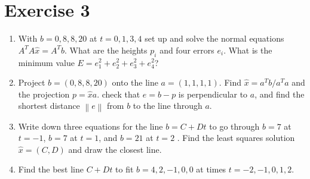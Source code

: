 \section{Exercise 3}
\begin{enumerate}[label=(\alph*)]
    \item With $b = 0, 8, 8, 20$ at $t = 0, 1,3, 4$ set up and solve the
        normal equations $A^{T}A\widehat{x}=A^{T}b$. What are the heights
        $p_{i}$ and four errors $e_{i}$. What is the minimum value $E =
        e_{1}^{2} + e_{2}^{2} + e_{3}^{2} + e_{4}^{2}$?
        
    \item Project $b = (0,8,8,20)$ onto the line $a=(1,1,1,1)$. Find
        $\widehat{x} = a^{T}b/a^{T}a$ and the projection $p=\widehat{x}a$.
        check that $e=b-p$ is perpendicular to $a$, and find the shortest
        distance $\left\|e\right\|$ from $b$ to the line through $a$.

    \item Write down three equations for the line $b = C + Dt$ to go
        through $b = 7$ at $t=-1$, $b=7$ at $t=1$, and $b=21$ at $t=2$ .
        Find the least squares solution $\widehat{x} = (C,D)$ and draw the
        closest line.

    \item Find the best line $C + Dt$ to fit  $b=4, 2 , -1, 0,0$ at times
        $t=-2, -1, 0, 1, 2$.
\end{enumerate}
